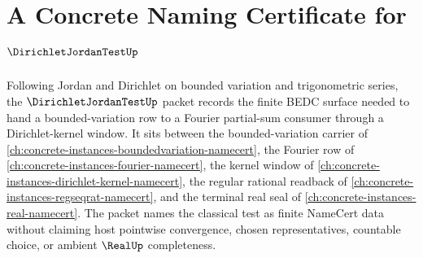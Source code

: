 \chapter{A Concrete Naming Certificate for $\DirichletJordanTestUp$}
\label{ch:concrete-instances-dirichlet-jordan-test-namecert}

Following Jordan and Dirichlet on bounded variation and trigonometric series, the $\DirichletJordanTestUp$ packet records the finite BEDC surface needed to hand a bounded-variation row to a Fourier partial-sum consumer through a Dirichlet-kernel window. It sits between the bounded-variation carrier of \autoref{ch:concrete-instances-boundedvariation-namecert}, the Fourier row of \autoref{ch:concrete-instances-fourier-namecert}, the kernel window of \autoref{ch:concrete-instances-dirichlet-kernel-namecert}, the regular rational readback of \autoref{ch:concrete-instances-regseqrat-namecert}, and the terminal real seal of \autoref{ch:concrete-instances-real-namecert}. The packet names the classical test as finite NameCert data without claiming host pointwise convergence, chosen representatives, countable choice, or ambient $\RealUp$ completeness.

